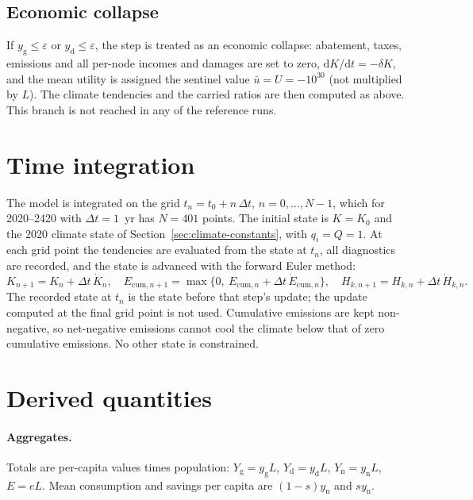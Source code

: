 \documentclass[11pt]{article}
\newcommand{\dd}{\mathrm{d}}
\newcommand{\yg}{y_{\mathrm{g}}}
\newcommand{\yd}{y_{\mathrm{d}}}
\newcommand{\yn}{y_{\mathrm{n}}}
\begin{document}
\subsection{Economic collapse}
\label{sec:collapse}

If $\yg\le\varepsilon$ or $\yd\le\varepsilon$, the step is treated as an
economic collapse: abatement, taxes, emissions and all per-node incomes and
damages are set to zero, $\dd K/\dd t = -\delta K$, and the mean utility is
assigned the sentinel value $\bar u = U = -10^{30}$ (not multiplied by $L$).
The climate tendencies and the carried ratios are then computed as above.
This branch is not reached in any of the reference runs.

\section{Time integration}
\label{sec:integration}

The model is integrated on the grid $t_n = t_0 + n\,\Delta t$,
$n = 0,\dots,N-1$, which for 2020--2420 with $\Delta t = 1$~yr has $N = 401$
points. The initial state is $K = K_0$ and the 2020 climate state of
Section~\ref{sec:climate-constants}, with $q_i = Q = 1$. At each grid point
the tendencies are evaluated from the state at $t_n$, all diagnostics are
recorded, and the state is advanced with the forward Euler method:
\begin{equation}
  K_{n+1} = K_n + \Delta t\,\dot K_n, \quad
  E_{\mathrm{cum},n+1} = \max\{0,\ E_{\mathrm{cum},n} + \Delta t\,\dot E_{\mathrm{cum},n}\}, \quad
  H_{k,n+1} = H_{k,n} + \Delta t\,\dot H_{k,n}.
\end{equation}
The recorded state at $t_n$ is the state before that step's update; the update
computed at the final grid point is not used. Cumulative emissions are kept
non-negative, so net-negative emissions cannot cool the climate below that of
zero cumulative emissions. No other state is constrained.

\section{Derived quantities}
\label{sec:derived}

\paragraph{Aggregates.} Totals are per-capita values times population:
$Y_{\mathrm{g}} = \yg L$, $Y_{\mathrm{d}} = \yd L$, $Y_{\mathrm{n}} = \yn L$,
$E = eL$. Mean consumption and savings per capita are $(1-s)\yn$ and $s\yn$.
\end{document}
